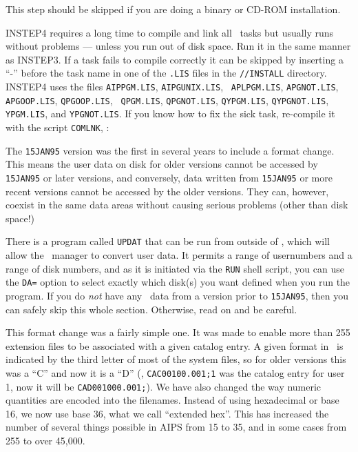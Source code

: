 
\bigskip

\vfill\eject%

This step should be skipped if you are doing a binary or CD-ROM
installation.

INSTEP4 requires a long time to compile and link all \aips\ tasks but
usually runs without problems --- unless you run out of disk space.  Run
it in the same manner as INSTEP3.  If a task fails to compile correctly
it can be skipped by inserting a ``-'' before the task name in one of
the {\tt *.LIS} files in the {\tt \AVERS/\ARCH/INSTALL} directory.
INSTEP4 uses the files {\tt AIPPGM.LIS}, {\tt AIPGUNIX.LIS}, {\tt
APLPGM.LIS}, {\tt APGNOT.LIS}, {\tt APGOOP.LIS}, {\tt QPGOOP.LIS}, {\tt
QPGM.LIS}, {\tt QPGNOT.LIS}, {\tt QYPGM.LIS}, {\tt QYPGNOT.LIS}, {\tt
YPGM.LIS}, and {\tt YPGNOT.LIS}.  If you know how to fix the sick task,
re-compile it with the script {\tt COMLNK},
\eg:\medskip

\medskip

\bigskip

\vfill\eject%

The {\tt 15JAN95} version was the first in several years to include a
format change.  This means the user data on disk for older versions
cannot be accessed by {\tt 15JAN95} or later versions, and conversely,
data written from {\tt 15JAN95} or more recent versions cannot be
accessed by the older versions.  They can, however, coexist in the same
data areas without causing serious problems (other than disk space!)

There is a program called {\tt UPDAT} that can be run from outside of
\ttaips, which will allow the \AIPS\ manager to convert user data.  It
permits a range of usernumbers and a range of disk numbers, and as it is
initiated via the {\tt RUN} shell script, you can use the {\tt DA=}
option to select exactly which disk(s) you want defined when you run the
program.  If you do {\it not\/} have any \AIPS\ data from a version
prior to {\tt 15JAN95}, then you can safely skip this whole section.
Otherwise, read on and be careful.

\medskip{}

This format change was a fairly simple one.  It was made to enable more
than 255 extension files to be associated with a given catalog entry.  A
given format in \AIPS\ is indicated by the third letter of most of the
system files, so for older versions this was a ``C'' and now it is a
``D'' (\eg, {\tt CAC00100.001;1} was the catalog entry for user 1, now
it will be {\tt CAD001000.001;}).  We have also changed the way numeric
quantities are encoded into the filenames.  Instead of using hexadecimal
or base 16, we now use base 36, what we call ``extended hex''.  This has
increased the number of several things possible in AIPS from 15 to 35,
and in some cases from 255 to over 45,000.

